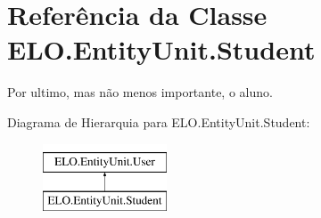 \hypertarget{classELO_1_1EntityUnit_1_1Student}{\section{Referência da Classe E\-L\-O.\-Entity\-Unit.\-Student}
\label{classELO_1_1EntityUnit_1_1Student}
}


Por ultimo, mas não menos importante, o aluno.  


Diagrama de Hierarquia para E\-L\-O.\-Entity\-Unit.\-Student\-:\begin{figure}[H]
\begin{center}
\leavevmode
\includegraphics[height=2.000000cm]{dd/d1d/classELO_1_1EntityUnit_1_1Student}
\end{center}
\end{figure}
